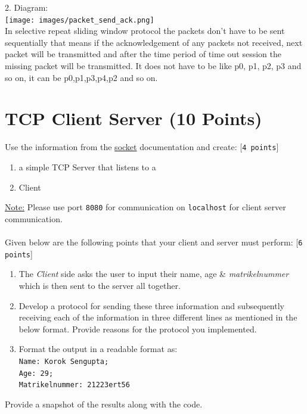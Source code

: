 \documentclass{WeSTassignment}
\begin{document}
2. Diagram: \\
\texttt{[image: images/packet\_send\_ack.png]} \\

In selective repeat sliding window protocol the packets don't have to be sent sequentially that means if the acknowledgement of any packets not received, next packet will be transmitted and after the time period of time out session the missing packet will be transmitted. It does not have to be like p0, p1, p2, p3 and so on, it can be p0,p1,p3,p4,p2 and so on.

\section{TCP Client Server (10 Points)}

Use the information from the \href{https://docs.python.org/3/howto/sockets.html}{socket} documentation and create: [\texttt{4 points}]
\begin{enumerate}
\item a simple TCP Server that listens to a
\item Client
\end{enumerate}
\underline{Note:} Please use port \texttt{8080} for communication on \texttt{localhost} for client server communication.\\ \\
Given below are the following points that your client and server must perform: [\texttt{6 points}]
\begin{enumerate}
\item The \emph{Client} side asks the user to input their name, age \& \emph{matrikelnummer} which is then sent to the server all together.
\item Develop a protocol for sending these three information and subsequently receiving each of the information in three different lines as mentioned in the below format. Provide reasons for the protocol you implemented. 
\item Format the output in a readable format as:\texttt{\\ Name: Korok Sengupta; \\ Age: 29; \\ Matrikelnummer: 21223ert56}
\end{enumerate}

Provide a snapshot of the results along with the code. \\
\end{document}
